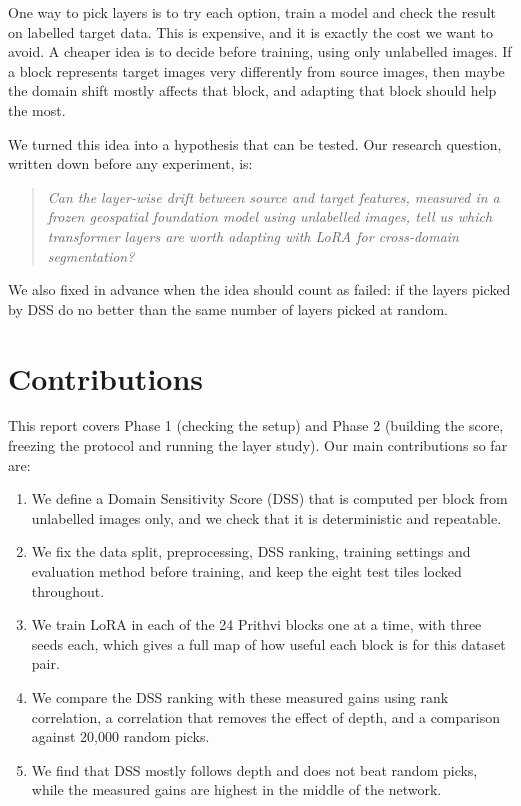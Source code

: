\documentclass[11pt,a4paper]{report}
\begin{document}
One way to pick layers is to try each option, train a model and check the result on labelled target data. This is expensive, and it is exactly the cost we want to avoid. A cheaper idea is to decide before training, using only unlabelled images. If a block represents target images very differently from source images, then maybe the domain shift mostly affects that block, and adapting that block should help the most.

We turned this idea into a hypothesis that can be tested. Our research question, written down before any experiment, is:

\begin{quote}
\textit{Can the layer-wise drift between source and target features, measured in a frozen geospatial foundation model using unlabelled images, tell us which transformer layers are worth adapting with LoRA for cross-domain segmentation?}
\end{quote}

We also fixed in advance when the idea should count as failed: if the layers picked by DSS do no better than the same number of layers picked at random.

\section{Contributions}

This report covers Phase 1 (checking the setup) and Phase 2 (building the score, freezing the protocol and running the layer study). Our main contributions so far are:

\begin{enumerate}
    \item We define a Domain Sensitivity Score (DSS) that is computed per block from unlabelled images only, and we check that it is deterministic and repeatable.
    \item We fix the data split, preprocessing, DSS ranking, training settings and evaluation method before training, and keep the eight test tiles locked throughout.
    \item We train LoRA in each of the 24 Prithvi blocks one at a time, with three seeds each, which gives a full map of how useful each block is for this dataset pair.
    \item We compare the DSS ranking with these measured gains using rank correlation, a correlation that removes the effect of depth, and a comparison against 20,000 random picks.
    \item We find that DSS mostly follows depth and does not beat random picks, while the measured gains are highest in the middle of the network.
\end{enumerate}
\end{document}
